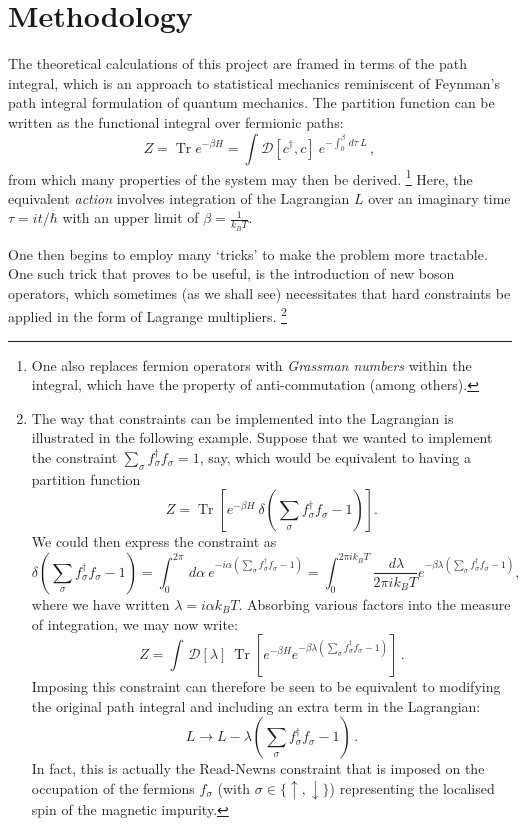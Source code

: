 \documentclass[12pt]{article}
\DeclareMathOperator{\Tr}{Tr}
\begin{document}

\section{Methodology} %

The theoretical calculations of this project are framed in terms of the path integral, which is an approach to statistical mechanics reminiscent of Feynman's path integral formulation of quantum mechanics. The partition function can be written as the functional integral over fermionic paths: $$ Z = \Tr{e^{- \beta H}} = \int \mathcal{D} [c^\dagger, c]~e^{-\int_{0}^{\beta} \,d\tau~L}\,, $$ from which many properties of the system may then be derived. \footnote{One also replaces fermion operators with \emph{Grassman numbers} within the integral, which have the property of anti-commutation (among others).} Here, the equivalent \emph{action} involves integration of the Lagrangian $ L $ over an imaginary time $ \tau = i t / \hbar $ with an upper limit of $ \beta = \frac{1}{k_B T} $.

One then begins to employ many `tricks' to make the problem more tractable. One such trick that proves to be useful, is the introduction of new boson operators, which sometimes (as we shall see) necessitates that hard constraints be applied in the form of Lagrange multipliers. \footnote{The way that constraints can be implemented into the Lagrangian is illustrated in the following example. Suppose that we wanted to implement the constraint $ \sum_{\sigma} f^{\dagger}_{\sigma} f^{}_{\sigma} = 1 $, say, which would be equivalent to having a partition function $$ Z = \Tr{\left[ e^{- \beta H}~\delta{\left( \sum_{\sigma} f^{\dagger}_{\sigma} f^{}_{\sigma} - 1 \right)} \right]} . $$ We could then express the constraint as $$ \delta{\left( \sum_{\sigma} f^{\dagger}_{\sigma} f^{}_{\sigma} - 1 \right)} = \int_{0}^{2 \pi} \,d\alpha~e^{- i \alpha (\sum_{\sigma} f^{\dagger}_{\sigma} f^{}_{\sigma} - 1)} = \int_{0}^{2 \pi i k_B T} \frac{\,d \lambda}{2 \pi i k_B T} e^{- \beta \lambda (\sum_{\sigma} f^{\dagger}_{\sigma} f^{}_{\sigma} - 1)}, $$ where we have written $ \lambda = i \alpha k_B T $. Absorbing various factors into the measure of integration, we may now write: $$ Z = \int \, \mathcal{D} [\lambda]~\Tr{\left[ e^{- \beta H} e^{- \beta \lambda (\sum_{\sigma} f^{\dagger}_{\sigma} f^{}_{\sigma} - 1)} \right]} \,. $$ Imposing this constraint can therefore be seen to be equivalent to modifying the original path integral and including an extra term in the Lagrangian: $$ L \rightarrow L - \lambda \left( \sum_{\sigma} f^{\dagger}_{\sigma} f^{}_{\sigma} - 1 \right) \,. $$ In fact, this is actually the Read-Newns constraint that is imposed on the occupation of the fermions $ f^{}_{\sigma} $ (with $ \sigma \in \{ \uparrow , \downarrow \}$) representing the localised spin of the magnetic impurity.}
\end{document}
